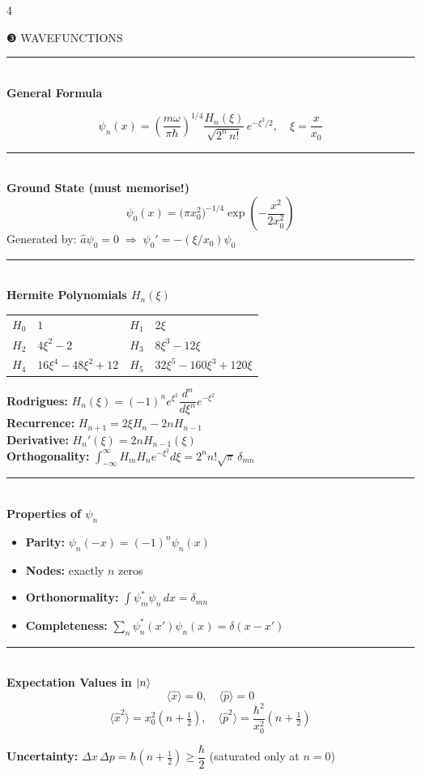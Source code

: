 \documentclass[9pt,landscape]{article}
\newcommand{\A}{\hat{a}}
\newcommand{\x}{\hat{x}}
\newcommand{\p}{\hat{p}}
\newcommand{\xz}{x_0}                     %
\newcommand{\half}{\tfrac{1}{2}}
\newcommand{\mysec}[1]{%
  \vspace{3pt}%
  {\color{midviolet}\rule{\linewidth}{0.6pt}}\\[-1pt]%
  {\bfseries\color{deepviolet}\small #1}\\[0.5pt]%
}
\begin{document}
\begin{multicols}{4}
\begin{tcolorbox}[sectionbox]
  \centering ❸\; WAVEFUNCTIONS
\end{tcolorbox}

\mysec{General Formula}
\begin{tcolorbox}[keybox]
\[
  \psi_n(x) = \left(\frac{m\omega}{\pi\hbar}\right)^{\!\!1/4}
              \frac{H_n(\xi)}{\sqrt{2^n\,n!}}\,e^{-\xi^2/2},\quad \xi=\frac{x}{\xz}
\]
\end{tcolorbox}

\mysec{Ground State (must memorise!)}
\[
  \psi_0(x) = \bigl(\pi\xz^2\bigr)^{-1/4}\exp\!\left(-\frac{x^2}{2\xz^2}\right)
\]
Generated by: $\A\psi_0 = 0 \;\Rightarrow\; \psi_0' = -(\xi/\xz)\psi_0$

\mysec{Hermite Polynomials $H_n(\xi)$}
\begin{center}
{\footnotesize
\begin{tabular}{@{}r@{\;=\;}l@{\quad}r@{\;=\;}l@{}}
$H_0$ & $1$           & $H_1$ & $2\xi$ \\
$H_2$ & $4\xi^2-2$    & $H_3$ & $8\xi^3-12\xi$ \\
$H_4$ & $16\xi^4-48\xi^2+12$ & $H_5$ & $32\xi^5-160\xi^3+120\xi$
\end{tabular}}
\end{center}
\textbf{Rodrigues:} $H_n(\xi)=(-1)^n e^{\xi^2}\dfrac{d^n}{d\xi^n}e^{-\xi^2}$\\[2pt]
\textbf{Recurrence:} $H_{n+1}=2\xi H_n - 2nH_{n-1}$\\
\textbf{Derivative:} $H_n'(\xi)=2nH_{n-1}(\xi)$\\
\textbf{Orthogonality:}
$\displaystyle\int_{-\infty}^{\infty}H_m H_n e^{-\xi^2}d\xi = 2^n n!\sqrt{\pi}\,\delta_{mn}$

\mysec{Properties of $\psi_n$}
\begin{itemize}[leftmargin=*, itemsep=0pt, topsep=0pt]
  \item \textbf{Parity:} $\psi_n(-x)=(-1)^n\psi_n(x)$
  \item \textbf{Nodes:} exactly $n$ zeros
  \item \textbf{Orthonormality:} $\int\psi_m^*\psi_n\,dx=\delta_{mn}$
  \item \textbf{Completeness:} $\sum_n\psi_n^*(x')\psi_n(x)=\delta(x-x')$
\end{itemize}

\mysec{Expectation Values in $\ket{n}$}
\[
  \langle\x\rangle=0,\quad\langle\p\rangle=0
\]
\[
  \langle\x^2\rangle=\xz^2\!\left(n+\half\right),\quad
  \langle\p^2\rangle=\frac{\hbar^2}{\xz^2}\!\left(n+\half\right)
\]
\begin{tcolorbox}[rosebox]
\textbf{Uncertainty:}\;
$\Delta x\,\Delta p = \hbar\!\left(n+\half\right)\geq\dfrac{\hbar}{2}$\;
(saturated only at $n=0$)
\end{tcolorbox}


\end{multicols}
\end{document}
